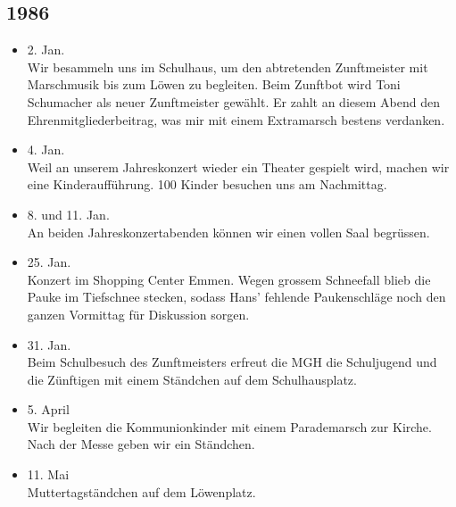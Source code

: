 \subsection*{1986}

\begin{history}


    \begin{itemize}

        \item 2. Jan.\\
              Wir besammeln uns im Schulhaus, um den abtretenden Zunftmeister mit
              Marschmusik bis zum Löwen zu begleiten. Beim Zunftbot wird Toni
              Schumacher als neuer Zunftmeister gewählt. Er zahlt an diesem Abend den
              Ehrenmitgliederbeitrag, was mir mit einem Extramarsch bestens verdanken.

        \item 4. Jan.\\
              Weil an unserem Jahreskonzert wieder ein Theater gespielt wird, machen
              wir eine Kinderaufführung. 100 Kinder besuchen uns am Nachmittag.

        \item 8. und 11. Jan.\\
              An beiden Jahreskonzertabenden können wir einen vollen Saal begrüssen.

        \item 25. Jan.\\
              Konzert im Shopping Center Emmen. Wegen grossem Schneefall blieb die
              Pauke im Tiefschnee stecken, sodass Hans' fehlende Paukenschläge noch
              den ganzen Vormittag für Diskussion sorgen.

        \item 31. Jan.\\
              Beim Schulbesuch des Zunftmeisters erfreut die MGH die Schuljugend und
              die Zünftigen mit einem Ständchen auf dem Schulhausplatz.

        \item 5. April\\
              Wir begleiten die Kommunionkinder mit einem Parademarsch zur Kirche.
              Nach der Messe geben wir ein Ständchen.

        \item 11. Mai\\
              Muttertagständchen auf dem Löwenplatz.


\end{itemize}
\end{history}
